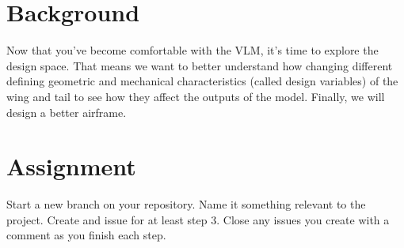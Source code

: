 \documentclass[12pt]{article}
\begin{document}
	

\section{Background}

Now that you've become comfortable with the VLM, it's time to explore the design space.
That means we want to better understand how changing different defining geometric and mechanical characteristics (called design variables) of the wing and tail to see how they affect the outputs of the model. 
Finally, we will design a better airframe. 



\section{Assignment}
Start a new branch on your repository. Name it something relevant to the project. Create and issue for at least step 3. Close any issues you create with a comment as you finish each step. 
\end{document}
